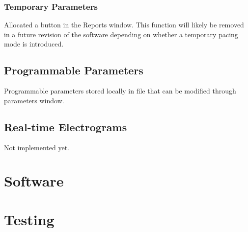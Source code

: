 \documentclass[12pt]{article}
\begin{document}
\subsubsection{Temporary Parameters}
Allocated a button in the Reports window. This function will likely be removed in a future revision of the software depending on whether a temporary pacing mode is introduced.

\subsection{Programmable Parameters}
Programmable parameters stored locally in file that can be modified through parameters window. 

\subsection{Real-time Electrograms}
Not implemented yet.

\newpage
\section{Software}
\subsection{}

\newpage
\section{Testing}
\subsection{}
\end{document}
